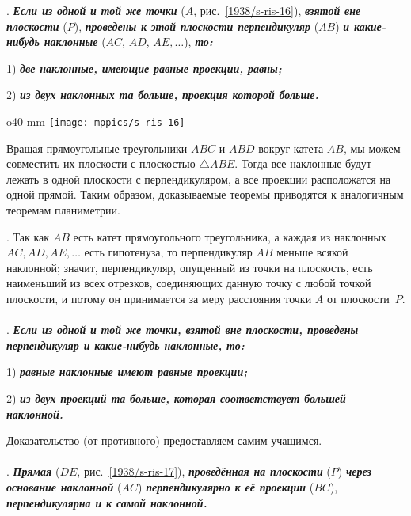 .
\textbf{\emph{Если из одной и той же точки}} ($A$, рис.~\ref{1938/s-ris-16}), \textbf{\emph{взятой вне плоскости}} ($P$), \textbf{\emph{проведены к этой плоскости перпендикуляр}} ($AB$) \textbf{\emph{и какие-нибудь наклонные}} ($AC$, $AD$, $AE,\dots$), \textbf{\emph{то:}}

1) \textbf{\emph{две наклонные, имеющие равные проекции, равны;}}

2) \textbf{\emph{из двух наклонных та больше, проекция которой больше.}} 

\begin{wrapfigure}{o}{40 mm}
\centering
\texttt{[image: mppics/s-ris-16]}
\caption{}\label{1938/s-ris-16}
\end{wrapfigure}

Вращая прямоугольные треугольники $ABC$ и $ABD$ вокруг катета $AB$, мы можем совместить их плоскости с плоскостью $\triangle ABE$.
Тогда все наклонные будут лежать в одной плоскости с перпендикуляром, а все проекции расположатся на одной прямой.
Таким образом, доказываемые теоремы приводятся к аналогичным теоремам планиметрии.

{\small
\medskip

\mbox{.}
Так как $AB$ есть катет прямоугольного треугольника, а каждая из наклонных $AC, AD, AE,\dots$ есть гипотенуза, то перпендикуляр $AB$ меньше всякой наклонной;
значит, перпендикуляр, опущенный из точки на плоскость, есть наименьший из всех отрезков, соединяющих данную точку с любой точкой плоскости, и потому он принимается за меру расстояния точки $A$ от плоскости~$P$.

}

\paragraph{}\label{1938/s27}
.
\textbf{\emph{Если из одной и той же точки, взятой вне плоскости, проведены перпендикуляр и какие-нибудь наклонные, то: }}

1) \textbf{\emph{равные наклонные имеют равные проекции;}}

2) \textbf{\emph{из двух проекций та больше, которая соответствует большей наклонной.}}

Доказательство (от противного) предоставляем самим учащимся.

\paragraph{}\label{1938/s28}.
\textbf{\emph{Прямая}} ($DE$, рис.~\ref{1938/s-ris-17}), \textbf{\emph{проведённая на плоскости}} ($P$) \textbf{\emph{через основание наклонной}} ($AC$) \textbf{\emph{перпендикулярно к её проекции}} ($BC$), \textbf{\emph{перпендикулярна и к самой наклонной.}}

